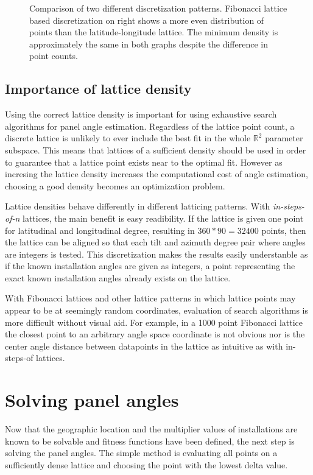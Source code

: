 \begin{figure}
\caption{Comparison of two different discretization patterns. Fibonacci lattice based discretization on right shows a more even distribution of points than the latitude-longitude lattice. The minimum density is approximately the same in both graphs despite the difference in point counts.}
     \label{fig_5stepfibolat}
\end{figure}

\newpage
\subsection{Importance of lattice density}\label{ss_lattice_density}
Using the correct lattice density is important for using exhaustive search algorithms for panel angle estimation. Regardless of the lattice point count, a discrete lattice is unlikely to ever include the best fit in the whole $\mathbb{R}^2$ parameter subspace. This means that lattices of a sufficient density should be used in order to guarantee that a lattice point exists near to the optimal fit. However as incresing the lattice density increases the computational cost of angle estimation, choosing a good density becomes an optimization problem.

Lattice densities behave differently in different latticing patterns. With \textit{in-steps-of-n} lattices, the main benefit is easy readibility. If the lattice is given one point for latitudinal and longitudinal degree, resulting in $360*90=32400$ points, then the lattice can be aligned so that each tilt and azimuth degree pair where angles are integers is tested. This discretization makes the results easily understanble as if the known installation angles are given as integers, a point representing the exact known installation angles already exists on the lattice.

With Fibonacci lattices and other lattice patterns in which lattice points may appear to be at seemingly random coordinates, evaluation of search algorithms is more difficult without visual aid. For example, in a 1000 point Fibonacci lattice the closest point to an arbitrary angle space coordinate is not obvious nor is the center angle distance between datapoints in the lattice as intuitive as with in-steps-of lattices.


\newpage
\section{Solving panel angles}
Now that the geographic location and the multiplier values of installations are known to be solvable and fitness functions have been defined, the next step is solving the panel angles. The simple method is evaluating all points on a sufficiently dense lattice and choosing the point with the lowest delta value.

